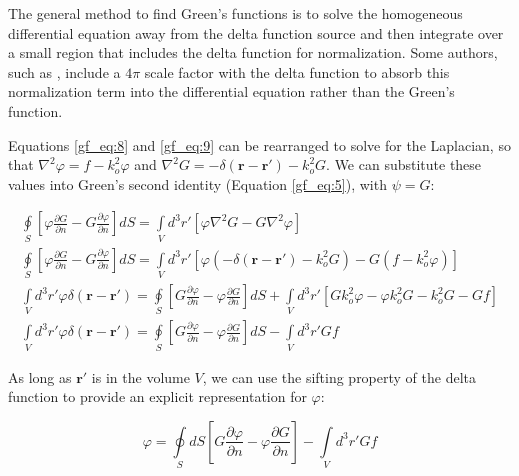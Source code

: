 The general method to find Green's functions is to solve the homogeneous differential equation away from the delta function source and then integrate over a small region that includes the delta function for normalization. Some authors, such as \cite{jackson_classical_em}, include a $4\pi$ scale factor with the delta function to absorb this normalization term into the differential equation rather than the Green's function.

Equations \ref{gf_eq:8} and \ref{gf_eq:9} can be rearranged to solve for the Laplacian, so that $\nabla^2\varphi = f - k_o^2\varphi$ and $\nabla^2G = -\delta\left(\mathbf{r}-\mathbf{r}' \right) - k_o^2G$. We can substitute these values into Green's second identity (Equation \ref{gf_eq:5}), with $\psi=G$:

\begin{equation}
\begin{gathered}
\oint\limits_{S} \left[ \varphi\frac{\partial G}{\partial n} - G\frac{\partial \varphi}{\partial n} \right]dS = \int\limits_{V}d^3r' \left[ \varphi\nabla^2G- G \nabla^2 \varphi\right] \\
\oint\limits_{S} \left[ \varphi\frac{\partial G}{\partial n} - G\frac{\partial \varphi}{\partial n} \right]dS = \int\limits_{V}d^3r' \left[ \varphi \left(-\delta\left(\mathbf{r}-\mathbf{r}' \right) - k_o^2G\right)- G \left(f - k_o^2\varphi \right)\right] \\
\int\limits_{V}d^3r'\varphi\delta\left(\mathbf{r}-\mathbf{r}' \right) = \oint\limits_{S}\left[G\frac{\partial \varphi}{\partial n} - \varphi\frac{\partial G}{\partial n} \right]dS +\int\limits_{V}d^3r'\left[ Gk_o^2\varphi - \varphi k_o^2G-k_o^2G - Gf \right] \\
\int\limits_{V}d^3r'\varphi\delta\left(\mathbf{r}-\mathbf{r}' \right) = \oint\limits_{S}\left[G\frac{\partial \varphi}{\partial n} - \varphi\frac{\partial G}{\partial n} \right]dS -\int\limits_{V}d^3r' Gf
\end{gathered}
\label{gf_eq:10}
\end{equation}
\renewcommand{\baselinestretch}{2} \small\normalsize

As long as $\mathbf{r}'$ is in the volume $V$, we can use the sifting property of the delta function to provide an explicit representation for $\varphi$:

\begin{equation}
\boxed{\varphi = \oint\limits_{S}dS\left[G\frac{\partial \varphi}{\partial n} - \varphi\frac{\partial G}{\partial n} \right] -\int\limits_{V}d^3r' Gf}
\label{gf_eq:11}
\end{equation}
\renewcommand{\baselinestretch}{2} \small\normalsize


